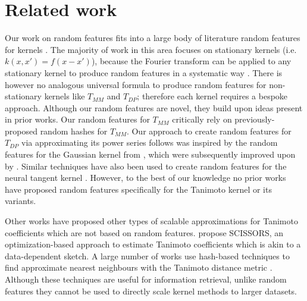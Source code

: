 \section{Related work}\label{sec:related-work}


Our work on random features fits into a large body
of literature random features
for kernels \citep{liu2021random}.
The majority of work in this area
focuses on stationary kernels (i.e.\@ $k(x,x')=f(x-x')$),
because the Fourier transform can be applied
to any stationary kernel to produce random features
in a systematic way \citep{rahimi2007random}.
There is however no analogous universal formula to produce
random features for non-stationary kernels like $T_{MM}$ and $T_{DP}$;
therefore each kernel requires a bespoke approach.
Although our random features are novel, they build upon ideas present in prior works.
Our random features for $T_{MM}$ critically rely on previously-proposed random hashes for $T_{MM}$.
Our approach to create random features for $T_{DP}$ via approximating its power series follows was inspired
by the random features for the Gaussian kernel from \citet{cotter2011explicit},
which were subsequently improved upon by \citet{ahle2020oblivious}.
Similar techniques have also been used to create random features for the neural tangent kernel \citep{zandieh2021scaling}.
However, to the best of our knowledge no prior
works have proposed random features specifically for the Tanimoto
kernel or its variants.

Other works have proposed other types of scalable approximations for Tanimoto coefficients which are not based on random features.
\citet{haque2010scissors} propose SCISSORS, an optimization-based approach to estimate Tanimoto coefficients which is akin to a data-dependent sketch.
A large number of works use hash-based techniques to find approximate nearest neighbours with the Tanimoto distance metric
\citep{nasr2010hashing,kristensen2011using,tabei2011sketchsort,anastasiu2017efficient}.
Although these techniques are useful for information retrieval,
unlike random features they cannot be used to directly scale kernel methods to larger datasets.
